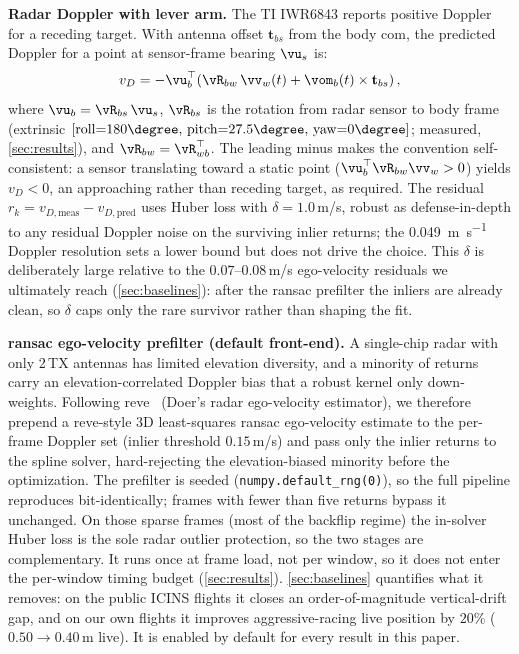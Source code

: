 \textbf{Radar Doppler with lever arm.}
The TI IWR6843 reports positive Doppler for a receding target.
With antenna offset $\mathbf{t}_{bs}$ from the body \ac{com}, the
predicted Doppler for a point at sensor-frame bearing $\vu_s$ is:
\begin{equation}
  v_D = -\vu_b^{\top}\!\left(
    \vR_{bw}\,\vv_w(t) + \vom_b(t) \times \mathbf{t}_{bs}
  \right),
  \label{eq:doppler}
\end{equation}
where $\vu_b = \vR_{bs}\,\vu_s$, $\vR_{bs}$ is the rotation from
radar sensor to body frame (extrinsic $[\text{roll}{=}180\degree,\,
\text{pitch}{=}27.5\degree,\,\text{yaw}{=}0\degree]$; measured,
\autoref{sec:results}), and
$\vR_{bw} = \vR_{wb}^{\top}$.  The leading minus makes the convention
self-consistent: a sensor translating toward a static point
($\vu_b^{\top}\vR_{bw}\vv_w > 0$) yields $v_D < 0$, an approaching rather
than receding target, as required.  The residual
$r_k = v_{D,\text{meas}} - v_{D,\text{pred}}$ uses Huber
loss with $\delta = 1.0$\,m/s, robust as defense-in-depth to any
residual Doppler noise on the surviving inlier returns; the
\SI{0.049}{\metre\per\second} Doppler resolution sets a lower bound but
does not drive the choice.  This $\delta$ is deliberately large relative to
the $0.07$--$0.08$\,m/s ego-velocity residuals we ultimately reach
(\autoref{sec:baselines}): after the \ac{ransac} prefilter the inliers are
already clean, so $\delta$ caps only the rare survivor rather than shaping
the fit.

\textbf{\ac{ransac} ego-velocity prefilter (default front-end).}
A single-chip radar with only 2\,TX antennas has limited elevation
diversity, and a minority of returns carry an elevation-correlated
Doppler bias that a robust kernel only down-weights.  Following
\mbox{reve}~\cite{doer2020ekf} (Doer's radar ego-velocity estimator), we
therefore prepend a \mbox{reve}-style 3D
least-squares \ac{ransac} ego-velocity estimate to the per-frame Doppler set
(inlier threshold $0.15$\,m/s) and pass only the inlier returns to the
spline solver, hard-rejecting the elevation-biased minority before the
optimization.  The prefilter is seeded
(\texttt{numpy.default\_rng(0)}), so the full pipeline reproduces
bit-identically; frames with fewer than five returns bypass it
unchanged.  On those sparse frames (most of the backflip regime) the
in-solver Huber loss is the sole radar outlier protection, so the two
stages are complementary.  It runs once at frame load, not per window, so
it does not enter the per-window timing budget (\autoref{sec:results}).
\autoref{sec:baselines} quantifies what it removes: on the public
ICINS flights it closes an order-of-magnitude vertical-drift gap, and on
our own flights it improves aggressive-racing live position by $20\%$ ($0.50\to0.40$\,m
live).  It is enabled by default for every result in this paper.

